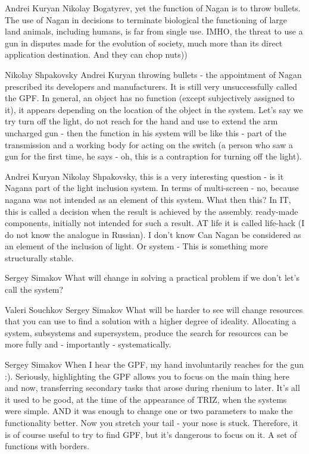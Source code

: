 \documentclass[11pt,a4paper]{article}
\begin{document}
Andrei Kuryan Nikolay Bogatyrev, yet the function of Nagan is to throw
bullets. The use of Nagan in decisions to terminate biological the functioning
of large land animals, including humans, is far from single use. IMHO, the
threat to use a gun in disputes made for the evolution of society, much more
than its direct application destination. And they can chop nuts))

Nikolay Shpakovsky Andrei Kuryan throwing bullets - the appointment of Nagan
prescribed its developers and manufacturers. It is still very unsuccessfully
called the GPF.  In general, an object has no function (except subjectively
assigned to it), it appears depending on the location of the object in the
system. Let's say we try turn off the light, do not reach for the hand and use
to extend the arm uncharged gun - then the function in his system will be like
this - part of the transmission and a working body for acting on the switch (a
person who saw a gun for the first time, he says - oh, this is a contraption
for turning off the light).

Andrei Kuryan Nikolay Shpakovsky, this is a very interesting question - is it
Nagana part of the light inclusion system. In terms of multi-screen - no,
because nagana was not intended as an element of this system. What then this?
In IT, this is called a decision when the result is achieved by the assembly.
ready-made components, initially not intended for such a result. AT life it is
called life-hack (I do not know the analogue in Russian). I don’t know Can
Nagan be considered as an element of the inclusion of light. Or system - This
is something more structurally stable.

Sergey Simakov What will change in solving a practical problem if we don’t
let's call the system?

Valeri Souchkov Sergey Simakov What will be harder to see will change
resources that you can use to find a solution with a higher degree of
ideality. Allocating a system, subsystems and supersystem, produce the search
for resources can be more fully and - importantly - systematically.

Sergey Simakov When I hear the GPF, my hand involuntarily reaches for the gun
:).  Seriously, highlighting the GPF allows you to focus on the main thing
here and now, transferring secondary tasks that arose during rhenium to
later. It's all it used to be good, at the time of the appearance of TRIZ,
when the systems were simple. AND it was enough to change one or two
parameters to make the functionality better.  Now you stretch your tail - your
nose is stuck. Therefore, it is of course useful to try to find GPF, but it’s
dangerous to focus on it. A set of functions with borders.
\end{document}
